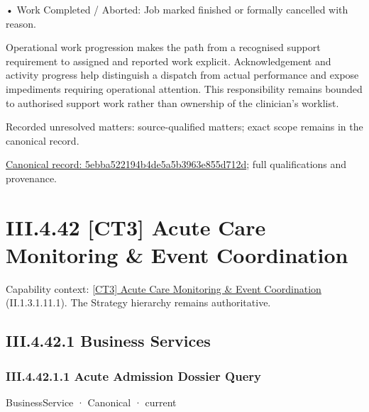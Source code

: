 •
Work Completed / Aborted: Job marked finished or formally cancelled with reason.



Operational work progression makes the path from a recognised support requirement to assigned and reported work explicit. Acknowledgement and activity progress help distinguish a dispatch from actual performance and expose impediments requiring operational attention. This responsibility remains bounded to authorised support work rather than ownership of the clinician's worklist.


{\small Recorded unresolved matters: source-qualified matters; exact scope remains in the canonical record.}\par
{\footnotesize \href{../../../../continuum/business/business-process/5ebba522194b4de5a5b3963e855d712d.md}{Canonical record: 5ebba522194b4de5a5b3963e855d712d}; full qualifications and provenance.}\par
\section*{III.4.42 [CT3] Acute Care Monitoring \& Event Coordination}
\label{navigation:III.4.42}

{\small Capability context: \hyperref[element:ee17b26b8c874cc3af50d07a787ce488]{[CT3] Acute Care Monitoring \& Event Coordination} (II.1.3.1.11.1). The Strategy hierarchy remains authoritative.}\par
\subsection*{III.4.42.1 Business Services}
\label{navigation:III.4.42.1}

\subsubsection*{III.4.42.1.1 Acute Admission Dossier Query}
\label{navigation:III.4.42.1.1}

\label{element:7276d5e4d484440f9466ec24c183bdab}
{\small BusinessService · Canonical · current}\par

